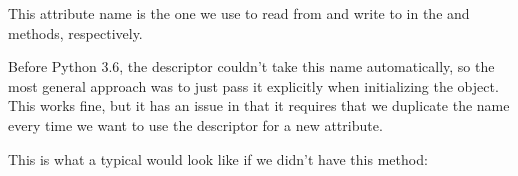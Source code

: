 \documentclass[a4paper,10pt,english]{sphinxmanual}
\begin{document}
This attribute name is the one we use to read from and write to  in the 
and  methods, respectively.

Before Python 3.6, the descriptor couldn’t take this name automatically, so the most general
approach was to just pass it explicitly when initializing the object. This works fine, but it
has an issue in that it requires that we duplicate the name every time we want to use the
descriptor for a new attribute.

This is what a typical  would look like if we didn’t have this method:

\begin{sphinxVerbatim}[commandchars=\\\{\}]
 

      
          

       
           
             

          
         \PYG{p}{[}\PYG{p}{]}

       
        \PYG{p}{[}\PYG{p}{]}  

 
      
\end{sphinxVerbatim}
\end{document}

